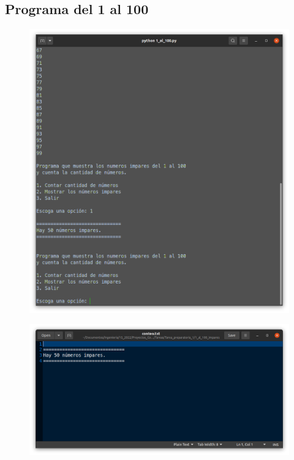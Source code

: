 \documentclass[12pt,letterpaper]{article}
\begin{document}
\begin{multicols}{2}


\section{Programa del 1 al 100}

\begin{figure}[H]
\centering
\includegraphics[width = \columnwidth]{1-py_1_al_100.png}
\end{figure}

\begin{figure}[H]
\centering
\includegraphics[width = \columnwidth]{1-txt-1_1_al_100.png}
\end{figure}


\end{multicols}
\end{document}
